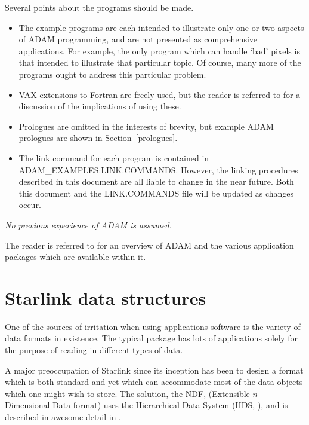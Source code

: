 Several points about the programs should be made.
\begin{itemize}
\item The example programs are each intended to illustrate
only one or two aspects of ADAM programming, and are not presented as
comprehensive applications.
For example, the only program which can handle `bad' pixels is that intended
to illustrate that particular topic. Of course, many more of the programs 
ought to address this particular problem.

\item VAX extensions to Fortran are freely used, but the reader is referred to 
 for a discussion of the implications of using these.

\item Prologues are omitted in the interests of brevity, but example ADAM 
prologues are shown in Section~\ref{prologues}.

\item The link command for each program is contained in 
ADAM\_EXAMPLES:LINK.COMMANDS. However, the linking procedures described in this 
document are all liable to change in the near future. Both this document and
the LINK.COMMANDS file will be updated as changes occur.

\end{itemize}

{\sl No previous experience of ADAM is assumed.}

The reader is referred to  for an overview of ADAM and the
various application packages which are available within it.

\newpage
\section{Starlink data structures\label{ndf}}

One of the sources of irritation when using applications software is the
variety of data formats in existence.
The typical package has lots of applications solely for the
purpose of reading in different types of data.

A major preoccupation of Starlink since its inception has been to 
design a format which
is both standard and yet which can accommodate most of the 
data objects which one might wish to store.
The solution,  the NDF, (Extensible $n$-Dimensional-Data format) uses
the Hierarchical Data System (HDS, ), and is described
in awesome detail in .

